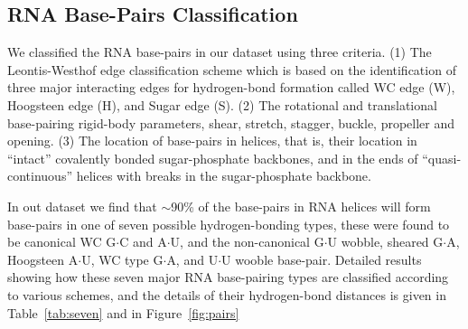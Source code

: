\subsection{RNA Base-Pairs Classification}
We classified the RNA base-pairs  in our dataset using three criteria.
(1) The Leontis-Westhof  edge classification scheme \cite{leontis1998}
which is based on the  identification of three major interacting edges
for hydrogen-bond  formation called WC  edge (W), Hoogsteen  edge (H),
and Sugar edge (S).  (2) The rotational and translational base-pairing
rigid-body parameters, shear,  stretch, stagger, buckle, propeller and
opening.  (3)  The location of  base-pairs in helices, that  is, their
location  in ``intact''  covalently bonded  sugar-phosphate backbones,
and in  the ends  of ``quasi-continuous'' helices  with breaks  in the
sugar-phosphate backbone.

In  out dataset  we  find that  $\sim$90\%  of the  base-pairs in  RNA
helices will form base-pairs in one of seven possible hydrogen-bonding
types, these  were found to  be canonical WC G$\cdot$C  and A$\cdot$U,
and the  non-canonical G$\cdot$U wobble,  sheared G$\cdot$A, Hoogsteen
A$\cdot$U, WC type G$\cdot$A, and U$\cdot$U wooble base-pair. Detailed
results  showing how  these  seven major  RNA  base-pairing types  are
classified  according to  various schemes,  and the  details  of their
hydrogen-bond  distances  is  given  in Table~\ref{tab:seven}  and  in
Figure~\ref{fig:pairs}

